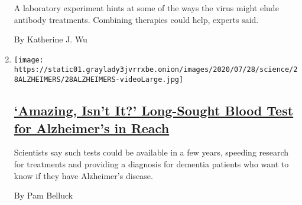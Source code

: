 \begin{enumerate}
  A laboratory experiment hints at some of the ways the virus might
  elude antibody treatments. Combining therapies could help, experts
  said.

  By Katherine J. Wu
\item
  \texttt{[image: https://static01.graylady3jvrrxbe.onion/images/2020/07/28/science/28ALZHEIMERS/28ALZHEIMERS-videoLarge.jpg]}

  \hypertarget{amazing-isnt-it-long-sought-blood-test-for-alzheimers-in-reach}{%
  \subsection{\texorpdfstring{\href{/2020/07/28/health/alzheimers-blood-test.html}{`Amazing,
  Isn't It?' Long-Sought Blood Test for Alzheimer's in
  Reach}}{`Amazing, Isn't It?' Long-Sought Blood Test for Alzheimer's in Reach}}\label{amazing-isnt-it-long-sought-blood-test-for-alzheimers-in-reach}}

  Scientists say such tests could be available in a few years, speeding
  research for treatments and providing a diagnosis for dementia
  patients who want to know if they have Alzheimer's disease.

  By Pam Belluck
\end{enumerate}

